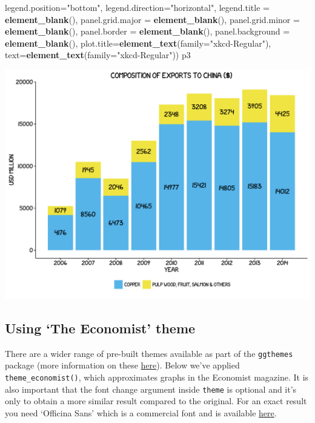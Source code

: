\documentclass[]{article}
\newenvironment{Shaded}{\begin{snugshade}}{\end{snugshade}}
\newcommand{\KeywordTok}[1]{\textcolor[rgb]{0.13,0.29,0.53}{\textbf{{#1}}}}
\newcommand{\DataTypeTok}[1]{\textcolor[rgb]{0.13,0.29,0.53}{{#1}}}
\newcommand{\StringTok}[1]{\textcolor[rgb]{0.31,0.60,0.02}{{#1}}}
\newcommand{\NormalTok}[1]{{#1}}
\begin{document}
\begin{Shaded}
\begin{Highlighting}[]
        \DataTypeTok{legend.position=}\StringTok{"bottom"}\NormalTok{, }\DataTypeTok{legend.direction=}\StringTok{"horizontal"}\NormalTok{, }
        \DataTypeTok{legend.title =} \KeywordTok{element_blank}\NormalTok{(),}
        \DataTypeTok{panel.grid.major =} \KeywordTok{element_blank}\NormalTok{(),}
        \DataTypeTok{panel.grid.minor =} \KeywordTok{element_blank}\NormalTok{(), }\DataTypeTok{panel.border =} \KeywordTok{element_blank}\NormalTok{(), }
        \DataTypeTok{panel.background =} \KeywordTok{element_blank}\NormalTok{(),}
        \DataTypeTok{plot.title=}\KeywordTok{element_text}\NormalTok{(}\DataTypeTok{family=}\StringTok{"xkcd-Regular"}\NormalTok{), }\DataTypeTok{text=}\KeywordTok{element_text}\NormalTok{(}\DataTypeTok{family=}\StringTok{"xkcd-Regular"}\NormalTok{)) }
\NormalTok{p3}
\end{Highlighting}
\end{Shaded}

\begin{center}\includegraphics{0_all_posts_pdf/bar_10-1} \end{center}

\subsection{\texorpdfstring{Using `The Economist'
theme}{Using The Economist theme}}\label{using-the-economist-theme-2}

There are a wider range of pre-built themes available as part of the
\texttt{ggthemes} package (more information on these
\href{https://cran.r-project.org/web/packages/ggthemes/vignettes/ggthemes.html}{here}).
Below we've applied \texttt{theme\_economist()}, which approximates
graphs in the Economist magazine. It is also important that the font
change argument inside \texttt{theme} is optional and it's only to
obtain a more similar result compared to the original. For an exact
result you need `Officina Sans' which is a commercial font and is
available \href{http://www.myfonts.com/fonts/itc/officina-sans/}{here}.
\end{document}
